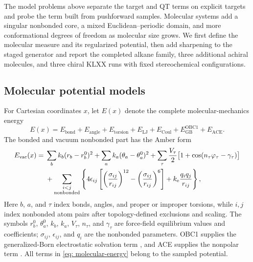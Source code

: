 \documentclass{article}
\begin{document}
The model problems above separate the target and QT terms on explicit targets and probe the term built from pushforward samples. Molecular systems add a singular nonbonded core, a mixed Euclidean--periodic domain, and more conformational degrees of freedom as molecular size grows. We first define the molecular measure and its regularized potential, then add sharpening to the staged generator and report the completed alkane family, three additional achiral molecules, and three chiral KLXX runs with fixed stereochemical configurations.

\subsection{Molecular potential models}
\label{sec: mol-models}

For Cartesian coordinates \(x\), let \(E(x)\) denote the complete molecular-mechanics energy
\begin{equation}
E(x)
=E_{\mathrm{bond}}+E_{\mathrm{angle}}+E_{\mathrm{torsion}}
 +E_{\mathrm{LJ}}+E_{\mathrm{Coul}}
 +E_{\mathrm{GB}}^{\mathrm{OBC1}}+E_{\mathrm{ACE}} .
\label{eq: molecular-energy}
\end{equation}
The bonded and vacuum nonbonded part has the Amber form \citep{cornell1995amber}
\begin{align}
E_{\mathrm{vac}}(x)
={}&\sum_{b} k_b(r_b-r_b^0)^2
 +\sum_{a} k_a(\theta_a-\theta_a^0)^2
 +\sum_{\tau}\frac{V_\tau}{2}
       \bigl[1+\cos(n_\tau\varphi_\tau-\gamma_\tau)\bigr] \notag\\
&+\sum_{\substack{i<j\\\mathrm{nonbonded}}}
 \left\lbrace 4\epsilon_{ij}\left[
 \left(\frac{\sigma_{ij}}{r_{ij}}\right)^{12}
 -\left(\frac{\sigma_{ij}}{r_{ij}}\right)^6\right]
 +k_{\mathrm e}\frac{q_iq_j}{r_{ij}}\right\rbrace ,
\label{eq: molecular-amber-energy}
\end{align}
Here $b$, $a$, and $\tau$ index bonds, angles, and proper or improper torsions, while $i,j$ index nonbonded atom pairs after topology-defined exclusions and scaling. The symbols $r_b^0$, $\theta_a^0$, $k_b$, $k_a$, $V_\tau$, $n_\tau$, and $\gamma_\tau$ are force-field equilibrium values and coefficients; $\sigma_{ij}$, $\epsilon_{ij}$, and $q_i$ are the nonbonded parameters. OBC1 supplies the generalized-Born electrostatic solvation term \citep{onufriev2004gb}, and ACE supplies the nonpolar term \citep{schaefer1996ace}. All terms in \eqref{eq: molecular-energy} belong to the sampled potential.
\end{document}
